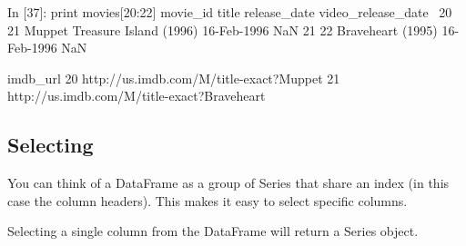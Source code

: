 In [37]:
print movies[20:22]
    movie_id                          title release_date  video_release_date  \
20        21  Muppet Treasure Island (1996)  16-Feb-1996                 NaN   
21        22              Braveheart (1995)  16-Feb-1996                 NaN   

                                             imdb_url  
20  http://us.imdb.com/M/title-exact?Muppet%
21  http://us.imdb.com/M/title-exact?Braveheart%

\subsection{Selecting}

You can think of a DataFrame as a group of Series that share an index (in this case the column headers). This makes it easy to select specific columns.

Selecting a single column from the DataFrame will return a Series object.

